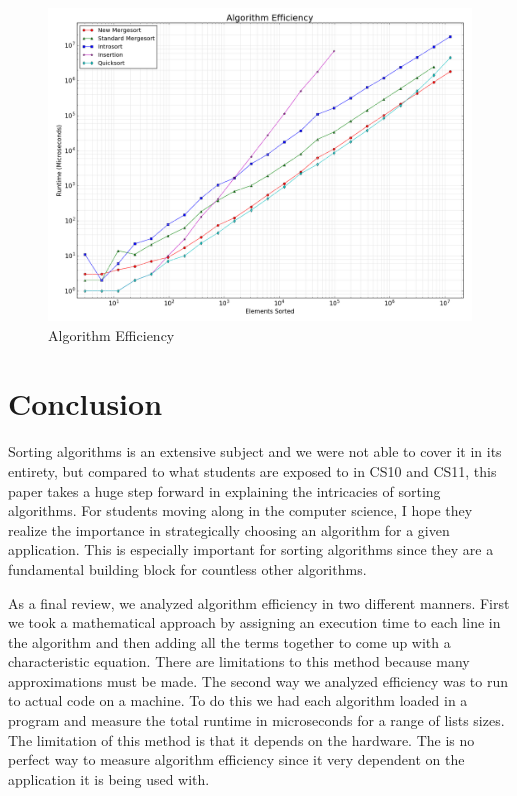 \documentclass[12pt]{article}
\begin{document}
	\begin{figure}[H]
		\centering
		\includegraphics[width=6in]{figure_3.png}
		\caption{Algorithm Efficiency}
		\label{fig:algeff}
	\end{figure}
	
\section{Conclusion}

Sorting algorithms is an extensive subject and we were not able to cover it in its entirety, but compared to what students are exposed to in CS10 and CS11, this paper takes a huge step forward in explaining the intricacies of sorting algorithms.
For students moving along in the computer science, I hope they realize the importance in strategically choosing an algorithm for a given application. 
This is especially important for sorting algorithms since they are a fundamental building block for countless other algorithms. 

As a final review, we analyzed algorithm efficiency in two different manners. 
First we took a mathematical approach by assigning an execution time to each line in the algorithm and then adding all the terms together to come up with a characteristic equation. 
There are limitations to this method because many approximations must be made. 
The second way we analyzed efficiency was to run to actual code on a machine. 
To do this we had each algorithm loaded in a program and measure the total runtime in microseconds for a range of lists sizes. 
The limitation of this method is that it depends on the hardware.
The is no perfect way to measure algorithm efficiency since it very dependent on the application it is being used with.
\end{document}

